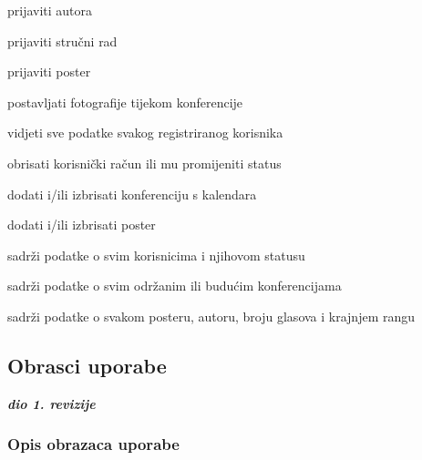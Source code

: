 \begin{packed_enum}
\begin{packed_enum}
					\item prijaviti autora
					\item prijaviti stručni rad
					\item prijaviti poster
					\item postavljati fotografije tijekom konferencije
					
				\end{packed_enum}

				\item  {}
				
				\begin{packed_enum}
					
					\item vidjeti sve podatke svakog registriranog korisnika
					\item obrisati korisnički račun ili mu promijeniti status
					\item dodati i/ili izbrisati konferenciju s kalendara
					\item dodati i/ili izbrisati poster
					
				\end{packed_enum}

			
				\item  {}
				
				\begin{packed_enum}
					
					\item sadrži podatke o svim korisnicima i njihovom statusu
					\item sadrži podatke o svim održanim ili budućim konferencijama
					\item sadrži podatke o svakom posteru, autoru, broju glasova i krajnjem rangu
					
				\end{packed_enum}
			\end{packed_enum}
			
			\eject 
			
			
				
			\subsection{Obrasci uporabe}
				
				\textbf{\textit{dio 1. revizije}}
				
				\subsubsection{Opis obrazaca uporabe}
					
